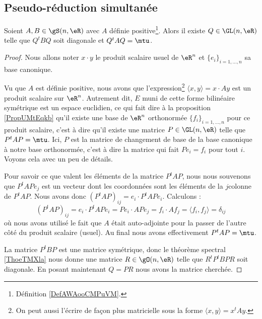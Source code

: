 \subsection{Pseudo-réduction simultanée}

\begin{corollary}  \label{CorNHKnLVA}
    Soient \( A,B\in \gS(n,\eR)\) avec \( A\) définie positive\footnote{Définition \ref{DefAWAooCMPuVM}.}. Alors il existe \( Q\in \GL(n,\eR)\) telle que \( Q^tBQ\) soit diagonale et \( Q^tAQ=\mtu\).
\end{corollary}

\begin{proof}
    Nous allons noter \( x\cdot y\) le produit scalaire usuel de \( \eR^n\) et \( \{ e_i \}_{i=1,\ldots, n}\) sa base canonique.

    Vu que \( A\) est définie positive, nous avons que l'expression\footnote{On peut aussi l'écrire de façon plus matricielle sous la forme \( \langle x, y\rangle =x^tAy\).} \( \langle x, y\rangle =x\cdot Ay\) est un produit scalaire sur \( \eR^n\). Autrement dit, \( E\) muni de cette forme bilinéaire symétrique est un espace euclidien, ce qui fait dire à la proposition \ref{PropUMtEqkb} qu'il existe une base de \( \eR^n\) orthonormée \( \{ f_i \}_{i=1,\ldots, n}\) pour ce produit scalaire, c'est à dire qu'il existe une matrice \( P\in \GL(n,\eR)\) telle que \( P^tAP=\mtu\). Ici, \( P\) est la matrice de changement de base de la base canonique à notre base orthonormée, c'est à dire la matrice qui fait \( Pe_i=f_i\) pour tout \( i\). Voyons cela avec un peu de détails.

    Pour savoir ce que valent les éléments de la matrice \( P^tAP\), nous nous souvenons que \( P^tAPe_j\) est un vecteur dont les coordonnées sont les éléments de la \( j\)\ieme colonne de \( P^tAP\). Nous avons donc \( (P^tAP)_{ij}=e_i\cdot P^tAPe_i\). Calculons :
    \begin{equation}
            (P^tAP)_{ij}=e_i\cdot P^tAPe_i
            =Pe_i\cdot APe_j
        =f_i\cdot Af_j
        =\langle f_i, f_j\rangle 
        =\delta_{ij}
    \end{equation}
    où nous avons utilisé le fait que \( A\) était auto-adjointe pour la passer de l'autre côté du produit scalaire (usuel). Au final nous avons effectivement \( P^tAP=\mtu\).

    La matrice \( P^tBP\) est une matrice symétrique, donc le théorème spectral \ref{ThoeTMXla} nous donne une matrice \( R\in \gO(n,\eR)\) telle que \( R^tP^tBPR\) soit diagonale. En posant maintenant \( Q=PR\) nous avons la matrice cherchée.
\end{proof}


